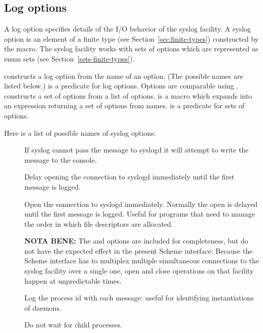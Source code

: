 \subsection*{Log options}

A log option specifies details of the I/O behavior of the syslog
facility.  A syslog option is an element of a finite type (see
Section~\ref{sec:finite-types}) constructed by the
 macro.  The syslog facility works with sets of
options which are represented as enum sets (see
Section~\ref{sets-finite-types}).

\begin{protos}
\end{protos}
\noindent
{} constructs a log option from the name of an
option.  (The possible names are listed below.)  
is a predicate for log options.  Options are comparable using
.   constructs a set of options
from a list of options.   is a macro which
expands into an expression returning a set of options from names.
 is a predicate for sets of options.

Here is a list of possible names of syslog options:

\begin{description}
\item[]
  If syslog cannot pass the message to syslogd it will attempt to
  write the message to the console.

\item[]
  Delay opening the connection to syslogd immediately until the first
  message is logged.

\item[]
  Open the connection to syslogd immediately.  Normally
  the open is delayed until the first message is logged.
  Useful for programs that need to manage the order in which
  file descriptors are allocated.

  \noindent\textbf{NOTA BENE:}
  The  and  options are included for
  completeness, but do not have the expected effect in the present
  Scheme interface: Because the Scheme interface has to multiplex
  multiple simultaneous connections to the syslog facility over a
  single one, open and close operations on that facility happen at
  unpredictable times.
  
\item[]
  Log the process id with each message: useful for identifying
  instantiations of daemons.

\item[]
  Do not wait for child processes.
\end{description}

